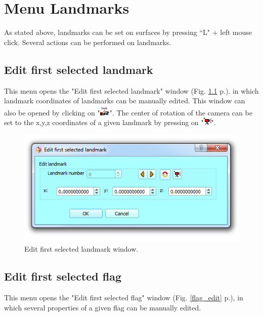 
\chapter{Menu Landmarks}\label{landmark_chapter}
\minitoc 


As stated above, landmarks can be set on surfaces by pressing ``L" + left mouse click. Several actions
can be performed on landmarks.


\section{Edit first selected landmark}
This menu opens the "Edit first selected landmark" window (Fig. \ref{landmark_edit} p.\pageref{landmark_edit}). in which landmark coordinates of landmarks can be manually edited. This window can also be opened by clicking on "\includegraphics[scale=0.7]{images/06/objects/landmark_edit.png}".
The center of rotation of the camera can be set to the x,y,z coordinates of a given landmark by pressing on "\includegraphics[scale=0.7]{images/10/move_cam3.png}".




\begin{figure}
  \centering
  \includegraphics[scale=0.55]{images/10/edit_landmark.png} 
	\caption{Edit first selected landmark window.}
\label{landmark_edit}
 
\end{figure}

\section{Edit first selected flag}
This menu opens the "Edit first selected flag" window (Fig. \ref{flag_edit} p.\pageref{flag_edit}), in which several properties of a given flag can be manually edited.

